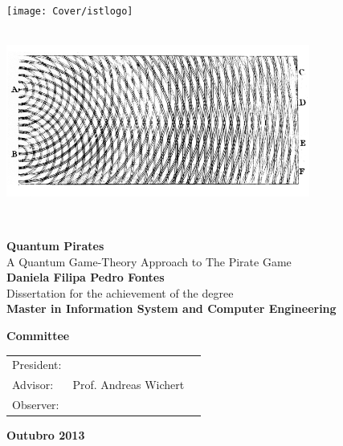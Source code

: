 \setcounter{page}{1} 


\thispagestyle{empty}
\begin{flushleft} ~\\ \vspace{-10mm} \hspace{-9mm}  \texttt{[image: Cover/istlogo]} 
\\ \vspace{5mm}
~\\ \begin{center} \includegraphics[height=50mm]{Figures/Cover/bU-lachas.png}  \end{center} %
~\\ \vspace{5mm}
\begin{centering}
\LARGE \textbf{Quantum Pirates}
\\ \vspace{5mm}
\Large A Quantum Game-Theory Approach to The Pirate Game
\\ \vspace{15mm}
\Large \textbf{Daniela Filipa Pedro Fontes}
\\ \vspace{15mm}
\large Dissertation for the achievement of the degree
\\ \vspace{2mm}
\LARGE \textbf{Master in Information System and Computer Engineering}
\\ \vspace{20mm}

\Large \textbf{Committee}
\\ \vspace{7mm}
\begin{tabular}{lcl}
\large President: 	&   & \large \\ 
\large Advisor:   &Prof. Andreas Wichert& \large \\ 
\large Observer:	 				&   & \large \\
\end{tabular}
 
\vspace{7mm}

\Large \textbf{Outubro 2013} \\
\end{centering}
\let\thepage\relax
\end{flushleft}
\pagebreak


